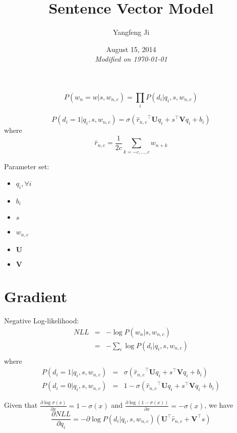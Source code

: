 \documentclass[12pt]{article}
\title{Sentence Vector Model}
\author{Yangfeng Ji}
\date{August 15, 2014\\ {\em Modified on \today}}
\newcommand{\trans}[1]{{#1}^{\top}}
\newcommand{\sigmoid}[1]{\sigma\left(#1\right)}
\newcommand{\ww}{\mathbf{U}}
\newcommand{\ws}{\mathbf{V}}
\begin{document}
 
\maketitle

\begin{equation}
  P(w_n=w|s, w_{n,c})=\prod_iP(d_i|q_i, s, w_{n,c})
\end{equation}

\begin{equation}
  P(d_i=1|q_i, s, w_{n,c})=\sigmoid{\trans{\hat{r}_{n,c}}\ww q_i + \trans{s}\ws q_i + b_i}
\end{equation}
where 
\begin{equation}
  \hat{r}_{n,c}=\frac{1}{2c}\sum_{k=-c,\dots,c}w_{n+k}
\end{equation}

Parameter set: 
\begin{itemize}
\item $q_i, \forall i$
\item $b_i$
\item $s$
\item $w_{n,c}$
\item $\ww$
\item $\ws$
\end{itemize}

\section{Gradient}
Negative Log-likelihood:
\begin{eqnarray}
  NLL &=& -\log P(w_n|s,w_{n,c})\\
  &=&-\sum_{i}\log P(d_i|q_i,s,w_{n,c})\\
\end{eqnarray}
where 
\begin{eqnarray}
  P(d_i=1|q_i,s,w_{n,c}) &=& \sigmoid{\trans{\hat{r}_{n,c}}\ww q_i + \trans{s}\ws q_i + b_i}\\
  P(d_i=0|q_i,s,w_{n,c}) &=& 1-\sigmoid{\trans{\hat{r}_{n,c}}\ww q_i + \trans{s}\ws q_i + b_i}
\end{eqnarray}

Given that $\frac{\partial\log\sigmoid{x}}{\partial x}=1-\sigmoid{x}$ and $\frac{\partial\log(1-\sigmoid{x})}{\partial x}=-\sigmoid{x}$, we have 
\begin{equation}
  \frac{\partial NLL}{\partial q_i}=-\partial\log P(d_i|q_i,s,w_{n,c})
  \left(
    \trans{\ww}\hat{r}_{n,c} + \trans{\ws}s
  \right)
\end{equation}
\end{document}
